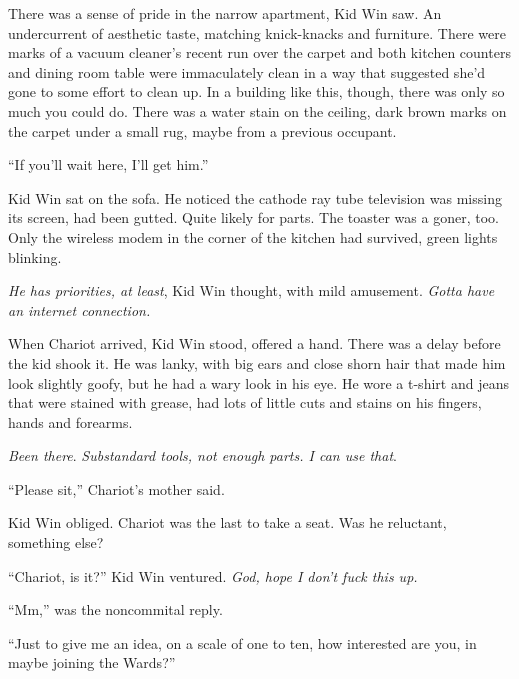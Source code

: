There was a sense of pride in the narrow apartment, Kid Win saw.  An undercurrent of aesthetic taste, matching knick-knacks and furniture.   There were marks of a vacuum cleaner's recent run over the carpet and both kitchen counters and dining room table were immaculately clean in a way that suggested she'd gone to some effort to clean up.  In a building like this, though, there was only so much you could do.  There was a water stain on the ceiling, dark brown marks on the carpet under a small rug, maybe from a previous occupant.



``If you'll wait here, I'll get him.''



Kid Win sat on the sofa.  He noticed the cathode ray tube television was missing its screen, had been gutted.  Quite likely for parts.  The toaster was a goner, too.  Only the wireless modem in the corner of the kitchen had survived, green lights blinking.



\emph{He has priorities, at least}, Kid Win thought, with mild amusement.  \emph{Gotta have an internet connection.}



When Chariot arrived, Kid Win stood, offered a hand.  There was a delay before the kid shook it.  He was lanky, with big ears and close shorn hair that made him look slightly goofy, but he had a wary look in his eye.  He wore a t-shirt and jeans that were stained with grease, had lots of little cuts and stains on his fingers, hands and forearms.



\emph{Been there}.  \emph{Substandard tools, not enough parts.  I can use that}.



``Please sit,'' Chariot's mother said.



Kid Win obliged.  Chariot was the last to take a seat.  Was he reluctant, something else?



``Chariot, is it?''  Kid Win ventured.  \emph{God, hope I don't fuck this up.}



``Mm,'' was the noncommital reply.



``Just to give me an idea, on a scale of one to ten, how interested are you, in maybe joining the Wards?''



